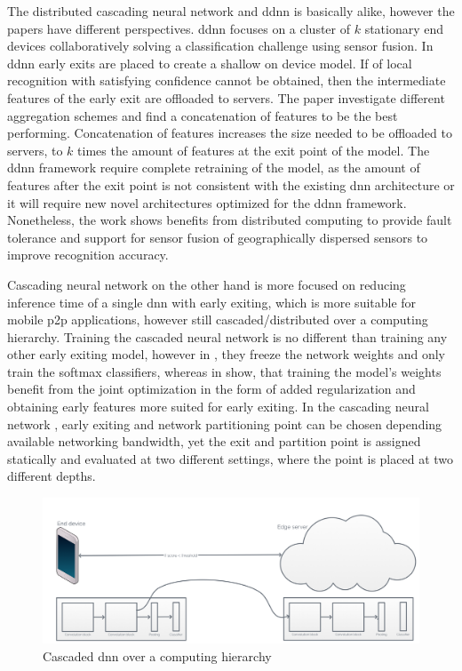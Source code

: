 The distributed cascading neural network and \gls{ddnn} is basically alike, however the papers have different perspectives. \gls{ddnn} focuses on a cluster of $k$ stationary end devices collaboratively solving a classification challenge using sensor fusion. In \gls{ddnn}  early exits are placed to create a shallow on device model. If of local recognition with satisfying confidence cannot be obtained, then the intermediate features of the early exit are offloaded to servers. The paper investigate different aggregation schemes and find a concatenation of features to be the best performing. Concatenation of features increases the size needed to be offloaded to servers, to $k$ times the amount of features at the exit point of the model. The \gls{ddnn} framework require complete retraining of the model, as the amount of features after the exit point is not consistent with the existing \gls{dnn} architecture or it will require new novel architectures optimized for the \gls{ddnn} framework. Nonetheless, the work shows benefits from distributed computing to provide fault tolerance and support for sensor fusion of geographically dispersed sensors to improve recognition accuracy.

Cascading neural network \cite{leroux_cascading_2017} on the other hand is more focused on reducing inference time of a single \gls{dnn} with early exiting, which is more suitable for mobile \gls{p2p} applications, however still cascaded/distributed over a computing hierarchy. Training the cascaded neural network is no different than training any other early exiting model, however in \cite{leroux_cascading_2017}, they freeze the network weights and only train the softmax classifiers, whereas in \cite{teerapittayanon_branchynet:_2016} show, that training the model's weights benefit from the joint optimization in the form of added regularization and obtaining early features more suited for early exiting. In the cascading neural network \cite{leroux_cascading_2017}, early exiting and network partitioning point can be chosen depending available networking bandwidth, yet the exit and partition point is assigned statically and evaluated at two different settings, where the point is placed at two different depths. 

\begin{figure}
	\centering
	\includegraphics[width=\linewidth]{figures/models/cascaded}
	\caption[Cascaded \gls{dnn} over a computing hierarchy]{Cascaded \gls{dnn} over a computing hierarchy}
\end{figure}

